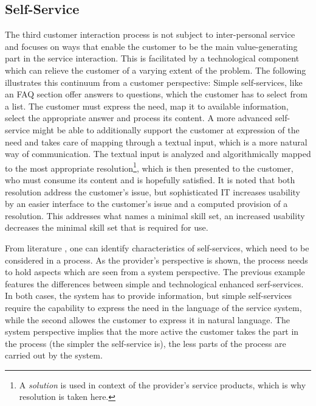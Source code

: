 	 	\subsection{Self-Service}
	 	 \label{pr:sel}
	 The third customer interaction process is not subject to inter-personal service \citep{Thomas2008self} and focuses on ways that enable the customer to be the main value-generating part in the service interaction. This is facilitated by a technological component which can relieve the customer of a varying extent of the problem. The following illustrates this continuum from a customer perspective: Simple self-services, like an \acrshort{FAQ} section offer answers to questions, which the customer has to select from a list. The customer must express the need, map it to available information, select the appropriate answer and process its content. A more advanced self-service might be able to additionally support the customer at expression of the need and takes care of mapping through a textual input, which is a more natural way of communication. The textual input is analyzed and algorithmically mapped to the most appropriate resolution\footnote{A \textit{solution} is used in context of the provider's service products, which is why resolution is taken here.}, which is then presented to the customer, who must consume its content and is hopefully satisfied. It is noted that both resolution address the customer's issue, but sophisticated \acrshort{IT} increases usability by an easier interface to the customer's issue and a computed provision of a resolution. This addresses what \cite{Thomas2008self} names a minimal skill set, \viz an increased usability decreases the minimal skill set that is required for use. 
	 
	 From literature \citep{meuter2000self, Thomas2008self, Thomas:2009}, one can identify characteristics of self-services, which need to be considered in a process. As the provider's perspective is shown, the process needs to hold aspects which are seen from a system perspective. The previous example features the differences between simple and technological enhanced serf-services. In both cases, the system has to provide information, but simple self-services require the capability to express the need in the language of the service system, while the second allowes the customer to express it in natural language. The system perspective implies that the more active the customer takes the part in the process (\ie the simpler the self-service is), the less parts of the process are carried out by the system. 
	 
